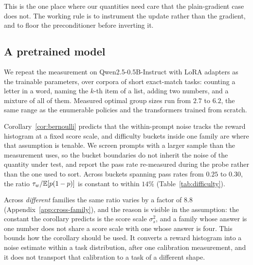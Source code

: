 This is the one place where our quantities need care that the plain-gradient case does not. The
working rule is to instrument the update rather than the gradient, and to floor the preconditioner
before inverting it.

\subsection{A pretrained model}

We repeat the measurement on Qwen2.5-0.5B-Instruct with LoRA adapters as the trainable parameters,
over corpora of short exact-match tasks: counting a letter in a word, naming the $k$-th item of a
list, adding two numbers, and a mixture of all of them. Measured optimal group sizes run from $2.7$
to $6.2$, the same range as the enumerable policies and the transformers trained from scratch.

Corollary~\ref{cor:bernoulli} predicts that the within-prompt noise tracks the reward histogram at a
fixed score scale, and difficulty buckets inside one family are where that assumption is tenable.
We screen prompts with a larger sample than the measurement uses, so the bucket boundaries do not
inherit the noise of the quantity under test, and report the pass rate re-measured during the probe
rather than the one used to sort. Across buckets spanning pass rates from $0.25$ to $0.30$, the
ratio $\tau_w/\mathbb{E}[p(1-p)]$ is constant to within $14\%$ (Table~\ref{tab:difficulty}).

\begin{table}[t]
  \centering
  \small
  
  \caption{Within-prompt noise across difficulty buckets of one task family. The gap between the
  screened and re-measured pass rates in the outer buckets is regression to the mean, which is why
  the screening sample is the larger of the two.}
  \label{tab:difficulty}
\end{table}

Across \emph{different} families the same ratio varies by a factor of $8.8$
(Appendix~\ref{app:cross-family}), and the reason is visible in the assumption: the constant the corollary
predicts is the score scale $\sigma_s^2$, and a family whose answer is one number does not share a
score scale with one whose answer is four. This bounds how the corollary should be used. It
converts a reward histogram into a noise estimate within a task distribution, after one calibration
measurement, and it does not transport that calibration to a task of a different shape.

